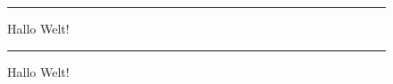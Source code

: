 \documentclass[ngerman]{scrartcl}
\begin{document}
\clearpage 
 
\begin{figure}%
\rule{\columnwidth}{5cm}
\caption{Hallo Welt!}%
\label{fig:test3}%
\end{figure}
 
\clearpage 
 
\begin{figure}%
\rule{\columnwidth}{5cm}
\caption{Hallo Welt!}%
\label{fig:test4}%
\end{figure}
 
\end{document}
